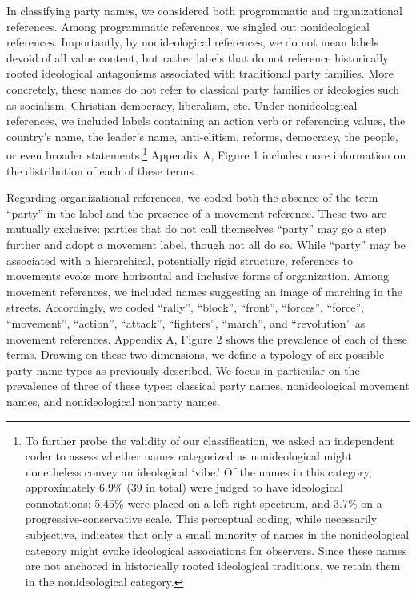 \documentclass[12pt]{article}
\begin{document}
In classifying party names, we considered both programmatic and organizational references. Among programmatic references, we singled out nonideological references. Importantly, by nonideological references, we do not mean labels devoid of all value content, but rather labels that do not reference historically rooted ideological antagonisms associated with traditional party families. More concretely, these names do not refer to classical party families or ideologies such as socialism, Christian democracy, liberalism, etc. Under nonideological references, we included labels containing an action verb or referencing values, the country's name, the leader's name, anti-elitism, reforms, democracy, the people, or even broader statements.\footnote{To further probe the validity of our classification, we asked an independent coder to assess whether names categorized as nonideological might nonetheless convey an ideological `vibe.' Of the names in this category, approximately 6.9\% (39 in total) were judged to have ideological connotations: 5.45\% were placed on a left-right spectrum, and 3.7\% on a progressive-conservative scale. This perceptual coding, while necessarily subjective, indicates that only a small minority of names in the nonideological category might evoke ideological associations for observers. Since these names are not anchored in historically rooted ideological traditions, we retain them in the nonideological category.} Appendix A, Figure 1 includes more information on the distribution of each of these terms.

Regarding organizational references, we coded both the absence of the term ``party'' in the label and the presence of a movement reference. These two are mutually exclusive: parties that do not call themselves ``party'' may go a step further and adopt a movement label, though not all do so. While ``party'' may be associated with a hierarchical, potentially rigid structure, references to movements evoke more horizontal and inclusive forms of organization. Among movement references, we included names suggesting an image of marching in the streets. Accordingly, we coded ``rally'', ``block'', ``front'', ``forces'', ``force'', ``movement'', ``action'', ``attack'', ``fighters'', ``march'', and ``revolution'' as movement references. Appendix A, Figure 2 shows the prevalence of each of these terms. Drawing on these two dimensions, we define a typology of six possible party name types as previously described. We focus in particular on the prevalence of three of these types: classical party names, nonideological movement names, and nonideological nonparty names.
\end{document}
